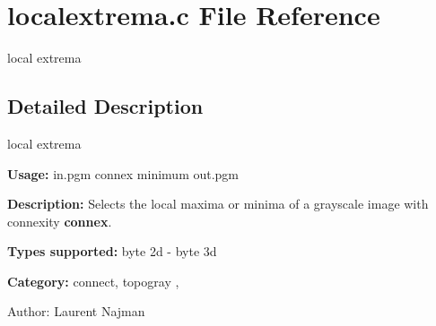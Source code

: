 \section{localextrema.c File Reference}
\label{localextrema_8c}
local extrema  




\label{_details}
\subsection{Detailed Description}
local extrema 

{\bf Usage:} in.pgm connex minimum out.pgm

{\bf Description:} Selects the local maxima or minima of a grayscale image with connexity {\bf connex}.

{\bf Types supported:} byte 2d - byte 3d

{\bf Category:} connect, topogray ,

\begin{Desc}
\item[Author:]Laurent Najman \end{Desc}
